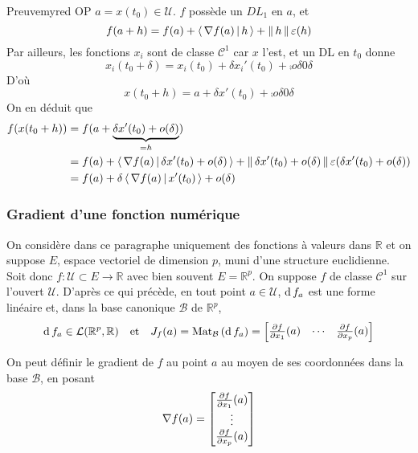     \begin{demo}{Preuve}{myred}
        OP $a = x(t_0) \in \mathcal{U}$. $f$ possède un $DL_1$ en $a$, et 
        \[ f(a+h) = f(a) + \left<\,\nabla f (a)\,\middle|\,h\,\right> + \left\lVert \,h \, \right\rVert \varepsilon(h) \]   
        Par ailleurs, les fonctions $x_i$ sont de classe $\mathcal{C}^1$ car $x$ l’est, et un DL en $t_0$ donne 
        \[ x_i(t_0 + \delta) = x_i(t_0) + \delta x_i'(t_0) + \comp{o}{\delta}{0}{\delta} \]   
        D’où
        \[ x(t_0 + h) = a + \delta x'(t_0) + \comp{o}{\delta}{0}{\delta} \]   
        On en déduit que 
        \begin{align*}
            f(x(t_0 + h)) 
            &= f(a + \underbrace{\delta x'(t_0) + o(\delta)}_{= h}) \\
            &= f(a) + \left<\,\nabla f(a)\,\middle|\,\delta x'(t_0) + o(\delta)\,\right> + \left\lVert \,\delta x'(t_0) + o(\delta) \, \right\rVert \varepsilon(\delta x'(t_0) + o(\delta)) \\
            &= f(a) + \delta \left<\,\nabla f(a)\,\middle|\,x'(t_0)\,\right> + o(\delta)
        \end{align*}
    \end{demo}

    \subsubsection{Gradient d’une fonction numérique}

    On considère dans ce paragraphe uniquement des fonctions à valeurs dans $\mathbb{R}$ et on suppose $E$, espace vectoriel de dimension $p$, muni d’une structure euclidienne. Soit donc $f : \mathcal{U} \subset E \to \mathbb{R}$ avec bien souvent $E = \mathbb{R}^p$. On suppose $f$ de classe $\mathcal{C}^1$ sur l’ouvert $\mathcal{U}$. D’après ce qui précède, en tout point $a \in \mathcal{U}$, $\operatorname{d} f_a$ est une forme linéaire et, dans la base canonique $\mathcal{B}$ de $\mathbb{R}^p$, 
    \[ \operatorname{d} f_a \in \mathcal{L}(\mathbb{R}^p,\mathbb{R}) \quad \text{et} \quad J_f(a) = \text{Mat}_{\mathcal{B}}\left(\operatorname{d} f_a\right) = \begin{bmatrix}
        \frac{\partial f}{\partial x_1}(a) & \cdots & \frac{\partial f}{\partial x_p}(a) 
    \end{bmatrix} \]   

    On peut définir le gradient de $f$ au point $a$ au moyen de ses coordonnées dans la base $\mathcal{B}$, en posant 
    \[ \nabla f(a) = \begin{bmatrix}
        \frac{\partial f}{\partial x_1}(a) \\ \vdots \\ \frac{\partial f}{\partial x_p}(a) 
    \end{bmatrix} \]   

